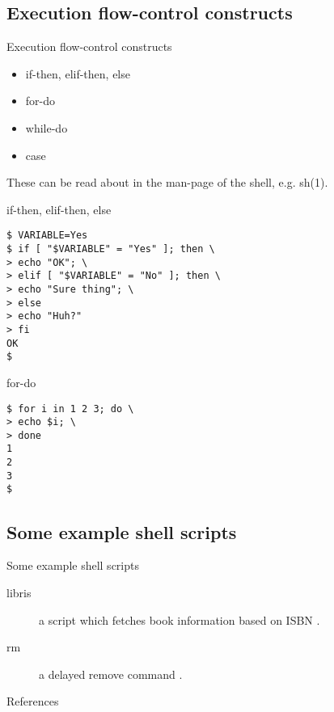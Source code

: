\documentclass{beamer}
\begin{document}
\subsection{Execution flow-control constructs}
\begin{frame}{Execution flow-control constructs}
	\begin{itemize}
		\item if-then, elif-then, else
		\item for-do
		\item while-do
		\item case
	\end{itemize}
	These can be read about in the man-page of the shell, e.g. sh(1).
\end{frame}
\begin{frame}[fragile]{if-then, elif-then, else}
	\begin{lstlisting}
$ VARIABLE=Yes
$ if [ "$VARIABLE" = "Yes" ]; then \
> echo "OK"; \
> elif [ "$VARIABLE" = "No" ]; then \
> echo "Sure thing"; \
> else
> echo "Huh?"
> fi
OK
$
	\end{lstlisting}
\end{frame}
\begin{frame}[fragile]{for-do}
	\begin{lstlisting}
$ for i in 1 2 3; do \
> echo $i; \
> done
1
2
3
$
	\end{lstlisting}
\end{frame}
\begin{comment}
\begin{frame}[fragile]{while-do}
	\begin{lstlisting}
$
	\end{lstlisting}
\end{frame}
\begin{frame}[fragile]{case}
	\begin{lstlisting}
$
	\end{lstlisting}
\end{frame}
\end{comment}

\subsection{Some example shell scripts}
\begin{frame}{Some example shell scripts}
	\begin{description}
		\item[libris] a script which fetches book information based on ISBN 
			\citep[for source see][]{Bosk2010libris}.
		\item[rm] a delayed remove command \citep[for source see][]{Bosk2012rm}.
	\end{description}
\end{frame}



\begin{frame}{References}
	
\end{frame}
\end{document}
